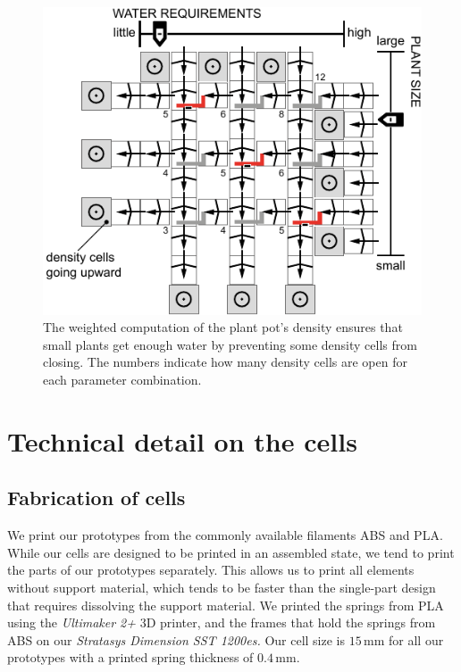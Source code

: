 \begin{figure} [h]  
    \includegraphics[width=\textwidth]{chapters/digital-metamaterials-FIG/21-plant-pot-logic.pdf}
    \caption[Short figure name.]{The weighted computation of the plant pot's density ensures that small plants get enough water by preventing some density cells from closing. The numbers indicate how many density cells are open for each parameter combination.
    \label{fig:21-plant-pot-logic}}
\end{figure}


\section{Technical detail on the cells}

\subsection{Fabrication of cells}

We print our prototypes from the commonly available filaments ABS and PLA. While our cells are designed to be printed in an assembled state, we tend to print the parts of our prototypes separately. This allows us to print all elements without support material, which tends to be faster than the single-part design that requires dissolving the support material. We printed the springs from PLA using the \textit{Ultimaker 2+} 3D printer, and the frames that hold the springs from ABS on our \textit{Stratasys Dimension SST 1200es.} Our cell size is $15\, \mathrm{mm}$ for all our prototypes with a printed spring thickness of $0.4\, \mathrm{mm}$.

